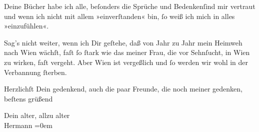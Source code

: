 \pstart
           Deine Bücher habe ich alle, beſonders die Sprüche und
                  Bedenkenſind mir vertraut und wenn ich nicht mit {\pb}allem »einverſtanden« bin,{ }ſo weiß ich mich in
               alles »einzufühlen«.\pend
           
\pstart
           Sag’s nicht weiter, wenn ich Dir geſtehe, daß von Jahr zu Jahr mein Heimweh nach Wien wächſt, faſt{ }ſo{ }ſtark wie das meiner Frau, die vor Sehnſucht, in
                  Wien zu wirken, faſt vergeht. Aber Wien ist vergeßlich und{ }ſo werden wir wohl in der
               Verbannung{ }ſterben.\pend
           
\pstart
           Herzlichſt Dein gedenkend, auch die paar Freunde, die noch meiner gedenken, beſtens
               grüßend\pend
           
\pstart
           Dein alter, allzu alter{\\[\baselineskip]}\spacefill\mbox{Hermann}\pend
           \leftskip=0em{}\endnumbering{}  \newcommand{\dateiname}{L02532}\newcommand{\titel}{Hermann Bahr an Arthur Schnitzler, 18. 2. 1930}\newcommand{\editorInnen}{Herausgegeben von Martin Anton Müller}
